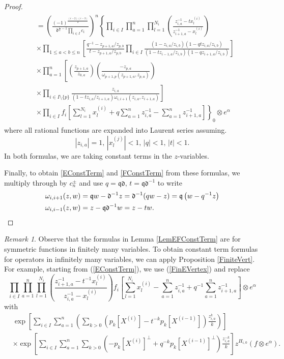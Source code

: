 \documentclass{amsart}
\newcommand{\qqq}{\mathfrak{q}}
\newcommand{\ddd}{\mathfrak{d}}
\theoremstyle{remark}
\newtheorem{rem}[thm]{Remark}
\numberwithin{thm}{section}
\numberwithin{equation}{section}
\begin{document}
\begin{proof}
\begin{align*}
\begin{split}
&=
\left( \frac{(-1)^{\frac{(r-2)(r-3)}{2}}}{\displaystyle\ddd^{\frac{r}{2}-1} \prod_{i\in I} c_i}\right)^n
\left\{\prod_{i\in I}\prod_{a=1}^n\prod_{l=1}^{N_i}\left(\frac{  z_{i,a}^{-1}-tx_{l}^{(i)} }{ z_{i+1,a}^{-1}-x_{l}^{(i)} }\right)\right.\\
&\times\prod_{1\le a<b\le n}
\left[
\frac{q^{-1}-z_{p+1,a}/z_{p,b}}{t-z_{p+1,a}/z_{p,b}} 
\prod_{i\in I}
\frac{\left(1-z_{i,a}/z_{i,b}\right)\left(1-qtz_{i,a}/z_{i,b}\right)}{\left(1-tz_{i-1,a}/z_{i,b}\right)\left(1-qz_{i+1,a}/z_{i,b}\right)}
\right]\\
&\times \prod_{a=1}^n
\left[
\left(\frac{z_{p+1,a}}{z_{0,a}}\right)
\left(\frac{-z_{p,a}}
{\omega_{p+1,p}(z_{p+1,a},z_{p,a})}\right)\right.\\
&\left.\times\prod_{i\in I\setminus\{p\}}
 \frac{z_{i,a}}{\left(1-tz_{i,a}/z_{i+1,a}\right)\omega_{i,i+1}(z_{i,a},z_{i+1,a})} \right]\\
&\left.\times 
\prod_{i\in I}f_i\left[ \sum_{l=1}^{N_i}  x_{l}^{(i)}+q\sum_{a=1}^n z_{i,a}^{-1}-\sum_{a=1}^n z_{i+1,a}^{-1}  \right]\right\}_0\otimes e^\alpha
\end{split}
\end{align*}
where all rational functions are expanded into Laurent series assuming.
\begin{equation}
|z_{i,a}|=1,\,
|x_{l}^{(j)}|<1,\,
|q|<1,\,
|t|<1.   
\label{FExpand}
\end{equation}
In both formulas, we are taking constant terms in the $z$-variables.

Finally, to obtain \eqref{EConstTerm} and \eqref{FConstTerm} from these formulas, we multiply through by $c_n^\pm$ and use
$q=\qqq\ddd,\, t=\qqq\ddd^{-1}$ to write
\begin{align*}
\omega_{i,i+1}(z,w)&= \qqq w-\ddd^{-1}z=\ddd^{-1}(qw-z)=\qqq\left(w-q^{-1}z\right)\\
\omega_{i,i-1}(z,w)&= z-\qqq\ddd^{-1}w=z-tw.\qedhere
\end{align*}
\end{proof}

\begin{rem}
    Observe that the formulas in Lemma \ref{LemEFConstTerm} are for symmetric functions in finitely many variables.
    To obtain constant term formulas for operators in infinitely many variables, we can apply Proposition \ref{FiniteVert}.
    For example, starting from (\ref{EConstTerm}), we use (\ref{FinEVertex}) and replace
    \[
    \prod_{i\in I}\prod_{a=1}^n\prod_{l=1}^{N_i}\left(\frac{ z_{i+1,a}^{-1}-t^{-1}x_{l}^{(i)} }{ z_{i,a}^{-1}-x_{l}^{(i)} }\right)
    f_i\left[ \sum_{l=1}^{N_i} x_{l}^{(i)}-\sum_{a=1}^nz_{i,a}^{-1}+q^{-1}\sum_{a=1}^n z_{i+1,a}^{-1} \right]
    \otimes e^\alpha
    \]
    with
    \begin{align*}
    &\exp\left[ \sum_{i\in I}\sum_{a=1}^n\left(\sum_{k>0}\left( p_k[X^{(i)}]-t^{-k}p_k[X^{(i-1)}] \right) \frac{z_{i,a}^k}{k}\right)\right]\\
    &\times\exp\left[\sum_{i\in I}\sum_{a=1}^n\sum_{k>0}\left( -p_k[X^{(i)}]^\perp+q^{-k}p_k[X^{(i-1)}]^\perp \right)\frac{z_{i,a}^{-k}}{k}  \right]z^{H_{i,0}} (f\otimes e^\alpha).   
    \end{align*}
\end{rem}
\end{document}
